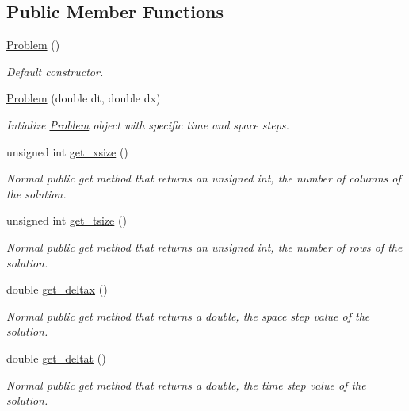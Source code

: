 \subsection*{Public Member Functions}
\begin{DoxyCompactItemize}
\item 
\hyperlink{classProblem_ad9d44f0ef936fb62f0ce41dd200494ac}{Problem} ()
\begin{DoxyCompactList}\small\item\em Default constructor. \end{DoxyCompactList}\item 
\hyperlink{classProblem_a2bd30352a90746e7b2c8233c59536259}{Problem} (double dt, double dx)
\begin{DoxyCompactList}\small\item\em Intialize \hyperlink{classProblem}{Problem} object with specific time and space steps. \end{DoxyCompactList}\item 
unsigned int \hyperlink{classProblem_af09d12c75d48d233c0e6b34266440a96}{get\+\_\+xsize} ()
\begin{DoxyCompactList}\small\item\em Normal public get method that returns an unsigned int, the number of columns of the solution. \end{DoxyCompactList}\item 
unsigned int \hyperlink{classProblem_a2f4ee1a3e797fe66181d7f62a3191366}{get\+\_\+tsize} ()
\begin{DoxyCompactList}\small\item\em Normal public get method that returns an unsigned int, the number of rows of the solution. \end{DoxyCompactList}\item 
double \hyperlink{classProblem_ae4d3597c10075ce871795528a34f1b0a}{get\+\_\+deltax} ()
\begin{DoxyCompactList}\small\item\em Normal public get method that returns a double, the space step value of the solution. \end{DoxyCompactList}\item 
double \hyperlink{classProblem_a5237b5ed257f9fae244573b64bea0c95}{get\+\_\+deltat} ()
\begin{DoxyCompactList}\small\item\em Normal public get method that returns a double, the time step value of the solution. \end{DoxyCompactList}\item 

\end{DoxyCompactItemize}

